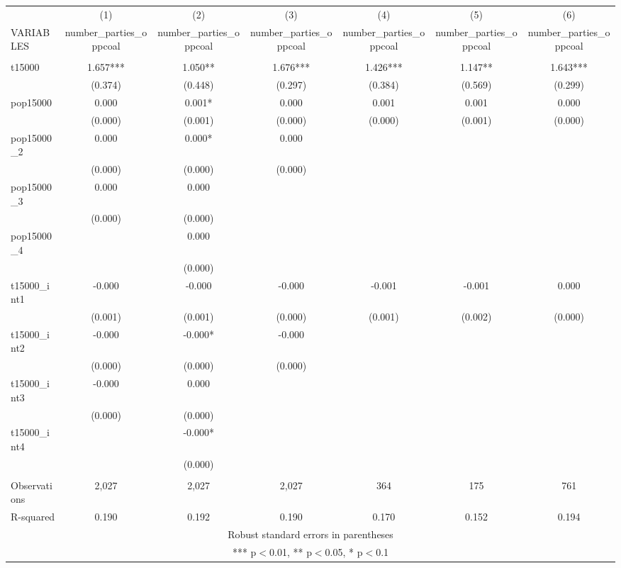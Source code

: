 \documentclass[]{article}
\begin{document}
\begin{tabular}{lcccccc} \hline
 & (1) & (2) & (3) & (4) & (5) & (6) \\
VARIABLES & number\_parties\_oppcoal & number\_parties\_oppcoal & number\_parties\_oppcoal & number\_parties\_oppcoal & number\_parties\_oppcoal & number\_parties\_oppcoal \\ \hline
 &  &  &  &  &  &  \\
t15000 & 1.657*** & 1.050** & 1.676*** & 1.426*** & 1.147** & 1.643*** \\
 & (0.374) & (0.448) & (0.297) & (0.384) & (0.569) & (0.299) \\
pop15000 & 0.000 & 0.001* & 0.000 & 0.001 & 0.001 & 0.000 \\
 & (0.000) & (0.001) & (0.000) & (0.000) & (0.001) & (0.000) \\
pop15000\_2 & 0.000 & 0.000* & 0.000 &  &  &  \\
 & (0.000) & (0.000) & (0.000) &  &  &  \\
pop15000\_3 & 0.000 & 0.000 &  &  &  &  \\
 & (0.000) & (0.000) &  &  &  &  \\
pop15000\_4 &  & 0.000 &  &  &  &  \\
 &  & (0.000) &  &  &  &  \\
t15000\_int1 & -0.000 & -0.000 & -0.000 & -0.001 & -0.001 & 0.000 \\
 & (0.001) & (0.001) & (0.000) & (0.001) & (0.002) & (0.000) \\
t15000\_int2 & -0.000 & -0.000* & -0.000 &  &  &  \\
 & (0.000) & (0.000) & (0.000) &  &  &  \\
t15000\_int3 & -0.000 & 0.000 &  &  &  &  \\
 & (0.000) & (0.000) &  &  &  &  \\
t15000\_int4 &  & -0.000* &  &  &  &  \\
 &  & (0.000) &  &  &  &  \\
 &  &  &  &  &  &  \\
Observations & 2,027 & 2,027 & 2,027 & 364 & 175 & 761 \\
 R-squared & 0.190 & 0.192 & 0.190 & 0.170 & 0.152 & 0.194 \\ \hline
\multicolumn{7}{c}{ Robust standard errors in parentheses} \\
\multicolumn{7}{c}{ *** p$<$0.01, ** p$<$0.05, * p$<$0.1} \\
\end{tabular}
\end{document}
